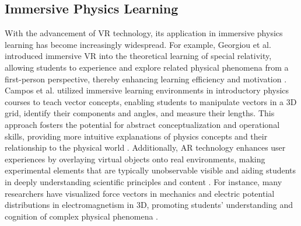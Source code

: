 \documentclass[runningheads]{llncs}
\begin{document}
\subsection{Immersive Physics Learning}
With the advancement of VR technology, its application in immersive physics learning has become increasingly widespread. For example, Georgiou et al. introduced immersive VR into the theoretical learning of special relativity, allowing students to experience and explore related physical phenomena from a first-person perspective, thereby enhancing learning efficiency and motivation \cite{georgiou2021learning}. Campos et al. utilized immersive learning environments in introductory physics courses to teach vector concepts, enabling students to manipulate vectors in a 3D grid, identify their components and angles, and measure their lengths. This approach fosters the potential for abstract conceptualization and operational skills, providing more intuitive explanations of physics concepts and their relationship to the physical world \cite{campos2022impact}. Additionally, AR technology enhances user experiences by overlaying virtual objects onto real environments, making experimental elements that are typically unobservable visible and aiding students in deeply understanding scientific principles and content \cite{pegrum2021augmented,prahani2022trend}. For instance, many researchers have visualized force vectors in mechanics and electric potential distributions in electromagnetism in 3D, promoting students' understanding and cognition of complex physical phenomena \cite{al2020effectiveness,teichrew2020augmented,ismail2019enhancing,boettcher2021using}.
\end{document}
